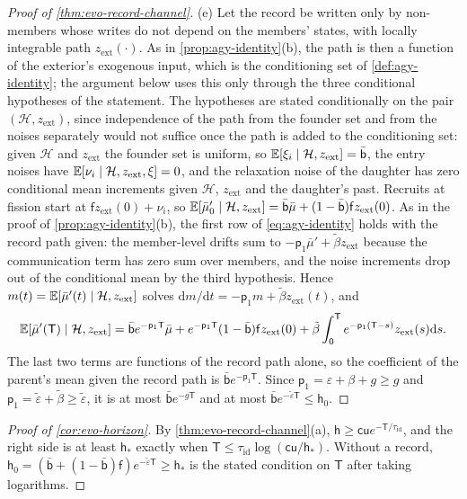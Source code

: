 \begin{proof}[Proof of \cref{thm:evo-record-channel}]
(e) Let the record be written only by non-members whose writes do not depend on the members' states, with locally integrable path $z_{\mathrm{ext}}(\cdot)$. As in \cref{prop:agy-identity}(b), the path is then a function of the exterior's exogenous input, which is the conditioning set of \cref{def:agy-identity}; the argument below uses this only through the three conditional hypotheses of the statement. The hypotheses are stated conditionally on the pair $(\mathcal H,z_{\mathrm{ext}})$, since independence of the path from the founder set and from the noises separately would not suffice once the path is added to the conditioning set: given $\mathcal H$ and $z_{\mathrm{ext}}$ the founder set is uniform, so $\mathbb{E}[\xi_i\mid\mathcal H,z_{\mathrm{ext}}]=\bar{\mathsf b}$, the entry noises have $\mathbb{E}[\nu_i\mid\mathcal H,z_{\mathrm{ext}},\xi]=0$, and the relaxation noise of the daughter has zero conditional mean increments given $\mathcal H$, $z_{\mathrm{ext}}$ and the daughter's past. Recruits at fission start at $\mathsf f z_{\mathrm{ext}}(0)+\nu_i$, so $\mathbb{E}[\bar\mu'_0\mid\mathcal H,z_{\mathrm{ext}}]=\bar{\mathsf b}\bar\mu+(1-\bar{\mathsf b})\mathsf f z_{\mathrm{ext}}(0)$. As in the proof of \cref{prop:agy-identity}(b), the first row of \eqref{eq:agy-identity} holds with the record path given: the member-level drifts sum to $-\mathsf p_1\bar\mu'+\tilde\beta z_{\mathrm{ext}}$ because the communication term has zero sum over members, and the noise increments drop out of the conditional mean by the third hypothesis. Hence $m(t)=\mathbb{E}[\bar\mu'(t)\mid\mathcal H,z_{\mathrm{ext}}]$ solves $\mathrm dm/\mathrm dt=-\mathsf p_1m+\tilde\beta z_{\mathrm{ext}}(t)$, and
\begin{equation*}
\mathbb{E}[\bar\mu'(\mathsf T)\mid\mathcal H,z_{\mathrm{ext}}]=\bar{\mathsf b}e^{-\mathsf p_1\mathsf T}\bar\mu+e^{-\mathsf p_1\mathsf T}(1-\bar{\mathsf b})\mathsf f z_{\mathrm{ext}}(0)+\tilde\beta\int_0^{\mathsf T}e^{-\mathsf p_1(\mathsf T-s)}z_{\mathrm{ext}}(s)\mathrm ds.
\end{equation*}
The last two terms are functions of the record path alone, so the coefficient of the parent's mean given the record path is $\bar{\mathsf b}e^{-\mathsf p_1\mathsf T}$. Since $\mathsf p_1=\varepsilon+\beta+g\ge g$ and $\mathsf p_1=\tilde\varepsilon+\tilde\beta\ge\tilde\varepsilon$, it is at most $\bar{\mathsf b}e^{-g\mathsf T}$ and at most $\bar{\mathsf b}e^{-\tilde\varepsilon\mathsf T}\le\mathsf h_0$.
\end{proof}

\begin{proof}[Proof of \cref{cor:evo-horizon}]
By \cref{thm:evo-record-channel}(a), $\mathsf h\ge\mathsf c\mathsf ue^{-\mathsf T/\tau_{\mathrm{id}}}$, and the right side is at least $\mathsf h_\ast$ exactly when $\mathsf T\le\tau_{\mathrm{id}}\log(\mathsf c\mathsf u/\mathsf h_\ast)$. Without a record, $\mathsf h_0=(\bar{\mathsf b}+(1-\bar{\mathsf b})\mathsf f)e^{-\tilde\varepsilon\mathsf T}\ge\mathsf h_\ast$ is the stated condition on $\mathsf T$ after taking logarithms.
\end{proof}

